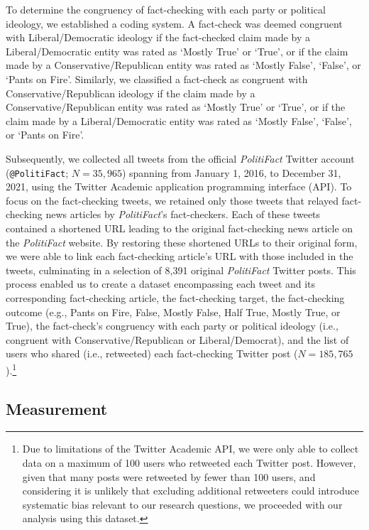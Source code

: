 \documentclass[
  12pt,
]{article}
\begin{document}
To determine the congruency of fact-checking with each party or
political ideology, we established a coding system. A fact-check was
deemed congruent with Liberal/Democratic ideology if the fact-checked
claim made by a Liberal/Democratic entity was rated as `Mostly True' or
`True', or if the claim made by a Conservative/Republican entity was
rated as `Mostly False', `False', or `Pants on Fire'. Similarly, we
classified a fact-check as congruent with Conservative/Republican
ideology if the claim made by a Conservative/Republican entity was rated
as `Mostly True' or `True', or if the claim made by a Liberal/Democratic
entity was rated as `Mostly False', `False', or `Pants on Fire'.

Subsequently, we collected all tweets from the official
\emph{PolitiFact} Twitter account (\texttt{@PolitiFact}; \(N = 35,965\))
spanning from January 1, 2016, to December 31, 2021, using the Twitter
Academic application programming interface (API). To focus on the
fact-checking tweets, we retained only those tweets that relayed
fact-checking news articles by \emph{PolitiFact}'s fact-checkers. Each
of these tweets contained a shortened URL leading to the original
fact-checking news article on the \emph{PolitiFact} website. By
restoring these shortened URLs to their original form, we were able to
link each fact-checking article's URL with those included in the tweets,
culminating in a selection of 8,391 original \emph{PolitiFact} Twitter
posts. This process enabled us to create a dataset encompassing each
tweet and its corresponding fact-checking article, the fact-checking
target, the fact-checking outcome (e.g., Pants on Fire, False, Mostly
False, Half True, Mostly True, or True), the fact-check's congruency
with each party or political ideology (i.e., congruent with
Conservative/Republican or Liberal/Democrat), and the list of users who
shared (i.e., retweeted) each fact-checking Twitter post
(\(N = 185,765\)).\footnote{Due to limitations of the Twitter Academic
  API, we were only able to collect data on a maximum of 100 users who
  retweeted each Twitter post. However, given that many posts were
  retweeted by fewer than 100 users, and considering it is unlikely that
  excluding additional retweeters could introduce systematic bias
  relevant to our research questions, we proceeded with our analysis
  using this dataset.}

\hypertarget{measurement}{%
\subsection{Measurement}\label{measurement}}
\end{document}
